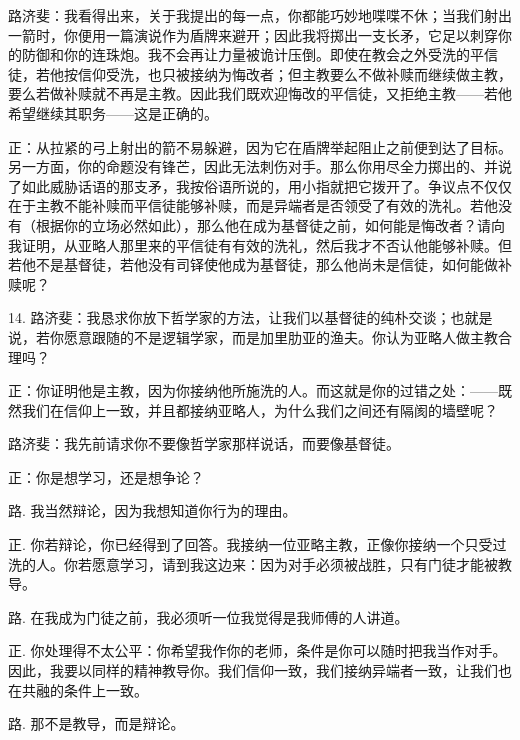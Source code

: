 路济斐：我看得出来，关于我提出的每一点，你都能巧妙地喋喋不休；当我们射出一箭时，你便用一篇演说作为盾牌来避开；因此我将掷出一支长矛，它足以刺穿你的防御和你的连珠炮。我不会再让力量被诡计压倒。即使在教会之外受洗的平信徒，若他按信仰受洗，也只被接纳为悔改者；但主教要么不做补赎而继续做主教，要么若做补赎就不再是主教。因此我们既欢迎悔改的平信徒，又拒绝主教——若他希望继续其职务——这是正确的。\par

正：从拉紧的弓上射出的箭不易躲避，因为它在盾牌举起阻止之前便到达了目标。另一方面，你的命题没有锋芒，因此无法刺伤对手。那么你用尽全力掷出的、并说了如此威胁话语的那支矛，我按俗语所说的，用小指就把它拨开了。争议点不仅仅在于主教不能补赎而平信徒能够补赎，而是异端者是否领受了有效的洗礼。若他没有（根据你的立场必然如此），那么他在成为基督徒之前，如何能是悔改者？请向我证明，从亚略人那里来的平信徒有有效的洗礼，然后我才不否认他能够补赎。但若他不是基督徒，若他没有司铎使他成为基督徒，那么他尚未是信徒，如何能做补赎呢？\par

14. 路济斐：我恳求你放下哲学家的方法，让我们以基督徒的纯朴交谈；也就是说，若你愿意跟随的不是逻辑学家，而是加里肋亚的渔夫。你认为亚略人做主教合理吗？\par

正：你证明他是主教，因为你接纳他所施洗的人。而这就是你的过错之处：——既然我们在信仰上一致，并且都接纳亚略人，为什么我们之间还有隔阂的墙壁呢？\par

路济斐：我先前请求你不要像哲学家那样说话，而要像基督徒。\par

正：你是想学习，还是想争论？\par

路. 我当然辩论，因为我想知道你行为的理由。\par

正. 你若辩论，你已经得到了回答。我接纳一位亚略主教，正像你接纳一个只受过洗的人。你若愿意学习，请到我这边来：因为对手必须被战胜，只有门徒才能被教导。\par

路. 在我成为门徒之前，我必须听一位我觉得是我师傅的人讲道。\par

正. 你处理得不太公平：你希望我作你的老师，条件是你可以随时把我当作对手。因此，我要以同样的精神教导你。我们信仰一致，我们接纳异端者一致，让我们也在共融的条件上一致。\par

路. 那不是教导，而是辩论。\par

